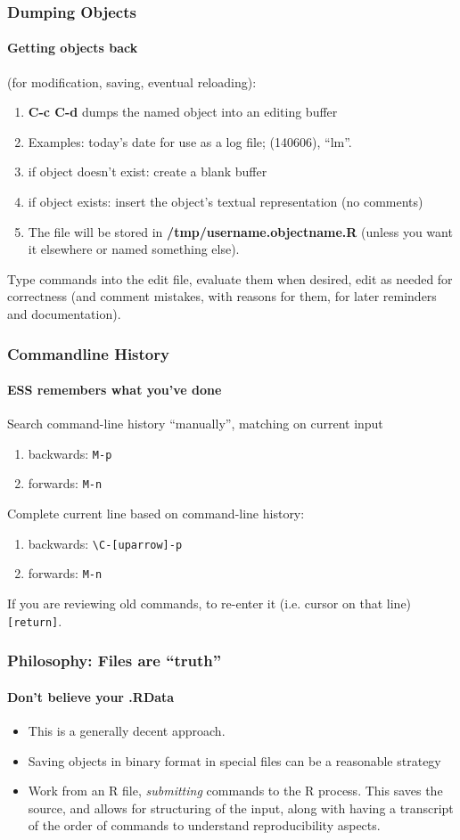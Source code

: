 \documentclass{beamer}
\begin{document}
\begin{frame}
  \frametitle{Dumping Objects}
  \framesubtitle{Getting objects back}
  (for modification, saving, eventual reloading):
  \begin{enumerate}
  \item \textbf{C-c C-d} dumps the named object into an editing buffer
  \item Examples: today's date for use as a log file; (140606), ``lm''.
  \item if object doesn't exist: create a blank buffer
  \item if object exists: insert the object's textual representation (no comments)
  \item The file will be stored in \textbf{/tmp/username.objectname.R}
    (unless you want it elsewhere or named something else).
  \end{enumerate}
  Type commands into the edit file, evaluate them when desired, edit
  as needed for correctness (and comment mistakes, with reasons for
  them, for later reminders and documentation).
\end{frame}

\begin{frame}[fragile]
  \frametitle{Commandline History}
  \framesubtitle{ESS remembers what you've done}
  Search command-line history ``manually'', matching on current input
  \begin{enumerate}
  \item backwards: \verb+M-p+
  \item forwards:  \verb+M-n+
  \end{enumerate}
  Complete current line based on command-line history:
  \begin{enumerate}
  \item backwards: \verb+\C-[uparrow]-p+
  \item forwards:  \verb+M-n+
  \end{enumerate}
  If you are reviewing old commands, to re-enter it (i.e. cursor on that line)
  \verb+[return]+.  
\end{frame}

\begin{frame}
  \frametitle{Philosophy: Files are ``truth''}
  \framesubtitle{Don't believe your .RData}
  \begin{itemize}
  \item This is a generally decent approach.
  \item Saving objects in binary format in special files can be a
    reasonable strategy
  \item Work from an R file, \emph{submitting} commands to the R
    process.  This saves the source, and allows for structuring of the
    input, along with having a transcript of the order of commands to
    understand reproducibility aspects.
  \end{itemize}
\end{frame}
\end{document}

